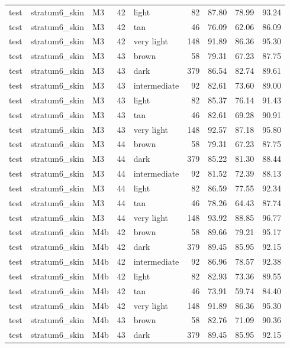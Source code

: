 \begin{tabular}{lllrlrrrr}
test & stratum6\_skin & M3 & 42 & light & 82 & 87.80 & 78.99 & 93.24 \\
test & stratum6\_skin & M3 & 42 & tan & 46 & 76.09 & 62.06 & 86.09 \\
test & stratum6\_skin & M3 & 42 & very light & 148 & 91.89 & 86.36 & 95.30 \\
test & stratum6\_skin & M3 & 43 & brown & 58 & 79.31 & 67.23 & 87.75 \\
test & stratum6\_skin & M3 & 43 & dark & 379 & 86.54 & 82.74 & 89.61 \\
test & stratum6\_skin & M3 & 43 & intermediate & 92 & 82.61 & 73.60 & 89.00 \\
test & stratum6\_skin & M3 & 43 & light & 82 & 85.37 & 76.14 & 91.43 \\
test & stratum6\_skin & M3 & 43 & tan & 46 & 82.61 & 69.28 & 90.91 \\
test & stratum6\_skin & M3 & 43 & very light & 148 & 92.57 & 87.18 & 95.80 \\
test & stratum6\_skin & M3 & 44 & brown & 58 & 79.31 & 67.23 & 87.75 \\
test & stratum6\_skin & M3 & 44 & dark & 379 & 85.22 & 81.30 & 88.44 \\
test & stratum6\_skin & M3 & 44 & intermediate & 92 & 81.52 & 72.39 & 88.13 \\
test & stratum6\_skin & M3 & 44 & light & 82 & 86.59 & 77.55 & 92.34 \\
test & stratum6\_skin & M3 & 44 & tan & 46 & 78.26 & 64.43 & 87.74 \\
test & stratum6\_skin & M3 & 44 & very light & 148 & 93.92 & 88.85 & 96.77 \\
test & stratum6\_skin & M4b & 42 & brown & 58 & 89.66 & 79.21 & 95.17 \\
test & stratum6\_skin & M4b & 42 & dark & 379 & 89.45 & 85.95 & 92.15 \\
test & stratum6\_skin & M4b & 42 & intermediate & 92 & 86.96 & 78.57 & 92.38 \\
test & stratum6\_skin & M4b & 42 & light & 82 & 82.93 & 73.36 & 89.55 \\
test & stratum6\_skin & M4b & 42 & tan & 46 & 73.91 & 59.74 & 84.40 \\
test & stratum6\_skin & M4b & 42 & very light & 148 & 91.89 & 86.36 & 95.30 \\
test & stratum6\_skin & M4b & 43 & brown & 58 & 82.76 & 71.09 & 90.36 \\
test & stratum6\_skin & M4b & 43 & dark & 379 & 89.45 & 85.95 & 92.15 \\

\end{tabular}
